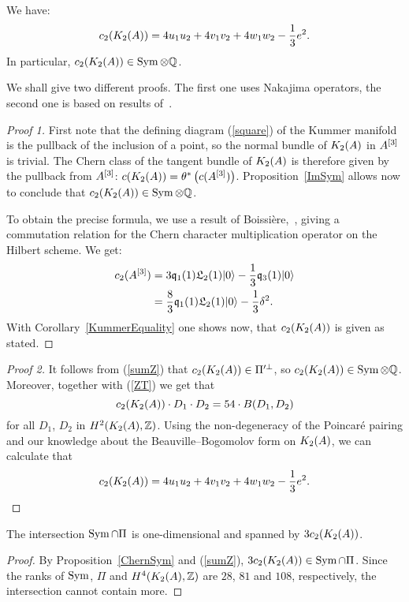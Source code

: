 \begin{proposition} \label{ChernSym}
We have:
\begin{equation}
c_2(K_{ 2 }( A ))= 4 u_1u_2 + 4v_1v_2 + 4 w_1 w_2 - \frac{1}{3} e^2. 
\end{equation}
In particular, $c_2(K_{ 2 }( A ))\in \operatorname{Sym} \otimes\mathbb{Q} $.
\end{proposition}
We shall give two different proofs. The first one uses Nakajima operators, the second one is based on results of~\cite{Hassett}.
\begin{proof}[Proof 1]
First note that the defining diagram (\ref{square}) of the Kummer manifold is the pullback of the inclusion of a point, so the normal bundle of $K_{ 2 }( A )$ in $A^{[3]}$ is trivial. The Chern class of the tangent bundle of $K_{ 2 }( A )$ is therefore given by the pullback from $A^{[3]}$: $c(K_{ 2 }( A )) = \theta^*\left(c(A^{[3]})\right)$. Proposition~\ref{ImSym} allows now to conclude that $c_2(K_{ 2 }( A ))\in \operatorname{Sym} \otimes \mathbb{Q}$.

To obtain the precise formula, we use a result of Boissi\`ere,~\cite[Lemma 3.12]{Boissiere}, giving a commutation relation for the Chern character multiplication operator on the Hilbert scheme. We get:
\begin{align*}
c_2(A^{[3]}) & = 3\mathfrak{q}_1(1)\mathfrak L_2(1)|0\rangle - \frac{1}{3} \mathfrak{q}_3(1)|0\rangle \\
 & =\frac{8}{3}\mathfrak{q}_1(1)\mathfrak L_2(1)|0\rangle - \frac{1}{3} \delta^2 .
\end{align*}
With Corollary~\ref{KummerEquality} one shows now, that $c_2(K_{ 2 }( A ))$ is given as stated.
\end{proof}
\begin{proof}[Proof 2]
It follows from (\ref{sumZ}) that $c_2(K_{ 2 }( A ))\in \Pi'^\perp$, so $c_2(K_{ 2 }( A )) \in \operatorname{Sym}\otimes\mathbb{Q}$. Moreover, together with (\ref{ZT}) we get that
\begin{equation*}
c_2(K_{ 2 }( A ))\cdot D_{1}\cdot D_{2}=54\cdot B(D_{1},D_{2})
\end{equation*}
for all $D_{1}$, $D_{2}$ in $H^{2}(K_{ 2 }( A ),\mathbb{Z})$. Using the non-degeneracy of the Poincar\'e pairing and our knowledge about the Beauville--Bogomolov form on $K_{ 2 }( A )$, we can calculate that
\begin{equation*}
c_2(K_{ 2 }( A ))= 4 u_1u_2 + 4v_1v_2 + 4 w_1 w_2 - \frac{1}{3} e^2.  \qedhere
\end{equation*}
\end{proof}


\begin{corollary}\label{Pi'}
The intersection $\operatorname{Sym}\cap \Pi$ is one-dimensional and spanned by $3c_2(K_{ 2 }( A ))$. 
\end{corollary}
\begin{proof}
By Proposition~\ref{ChernSym} and (\ref{sumZ}), $3c_2(K_{ 2 }( A ))\in \operatorname{Sym}\cap \Pi$. Since the ranks of $\operatorname{Sym}$, $\Pi$ and $H^4(K_{ 2 }( A ),\mathbb{Z})$ are $28$, $81$ and $108$, respectively, the intersection cannot contain more.
\end{proof}

